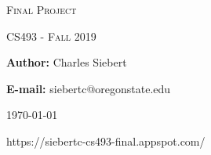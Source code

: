 \documentclass[letterpaper,11pt,titlepage,draftclsnofoot,onecolumn,compsoc,utf8,latin1]{IEEEtran}
\makeatletter
\def\name{Charles Siebert}
\def\mytitle{Final Project}
\def\myemail{siebertc@oregonstate.edu}
\makeatother
\begin{document}
\begin{titlepage}
\centering
\vspace*{9cm}
{\scshape\LARGE \mytitle} \\
	{\scshape\Large CS493 - Fall 2019 \par}
	\vspace{.5cm}
	{\large{\bfseries Author:} \name} \par
	{\large{\bfseries E-mail:} \myemail} \par
    {\large \today \par} 
    {\large https://siebertc-cs493-final.appspot.com/ \par} 
	\vspace*{1cm}

\end{titlepage}

\newpage

\thispagestyle{empty}

\tableofcontents

\cleardoublepage
{}

\newpage
\end{document}
